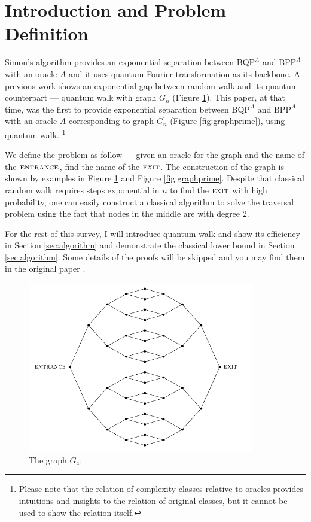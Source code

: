 \documentclass[aps,11pt,twoside,nofootinbib,tightenlines,superscriptaddress,preprintnumbers]{revtex4}
\newcommand{\<}{\langle}
\renewcommand{\>}{\rangle}
\newcommand{\BPP}{{\mathrm{BPP}}}
\newcommand{\BQP}{{\mathrm{BQP}}}
\newcommand{\ent}{{\textsc{entrance}}}
\newcommand{\exit}{{\textsc{exit}}}
\newenvironment{proof sketch}
{\trivlist\item\noindent{\bf Proof sketch}~}
{\qed\endtrivlist}
\begin{document}
\section{Introduction and Problem Definition} \label{sec:intro}
Simon's algorithm \cite{Sim94} provides an exponential separation between $\BQP^{A}$ and $\BPP^{A}$ with an oracle $A$ and it uses quantum Fourier transformation as its backbone. A previous work \cite{FG98} shows an exponential gap between random walk and its quantum counterpart --- quantum walk with graph $G_n$ (Figure \ref{fig:graph}). This paper, at that time, was the first to provide exponential separation between $\BQP^{A}$ and $\BPP^{A}$ with an oracle $A$ corresponding to graph $G^{\prime}_n$ (Figure \ref{fig:graphprime}), using quantum walk. \footnote{Please note that the relation of complexity classes relative to oracles provides intuitions and insights to the relation of original classes, but it cannot be used to show the relation itself.\cite{MITACT16}}

We define the problem as follow --- given an oracle for the graph and the name of the $\ent$, find the name of the $\exit$. The construction of the graph is shown by examples in Figure \ref{fig:graph} and Figure \ref{fig:graphprime}. Despite that classical random walk requires steps exponential in $n$ to find the $\exit$ with high probability, one can easily construct a classical algorithm to solve the traversal problem using the fact that nodes in the middle are with degree $2$.

For the rest of this survey, I will introduce quantum walk and show its efficiency in Section \ref{sec:algorithm} and demonstrate the classical lower bound in Section \ref{sec:algorithm}. Some details of the proofs will be skipped and you may find them in the original paper \cite{EXP03}.

\begin{figure}
\includegraphics[width=280pt]{basicgraph4}
\caption{The graph $G_4$.}
\label{fig:graph}
\end{figure}
\end{document}
